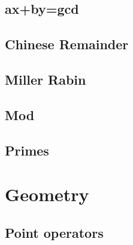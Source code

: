 \documentclass[10pt,twocolumn,oneside]{article}
\begin{document}
\subsection{ax+by=gcd}


\subsection{Chinese Remainder}

\subsection{Miller Rabin}


\subsection{Mod}


\subsection{Primes}


\section{Geometry}

\subsection{Point operators}

\end{document}
